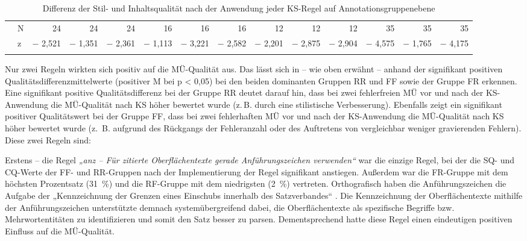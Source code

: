 \begin{sidewaystable}
\begin{tabularx}{\textwidth}{llrrrrrrrrrrrr}
& N & \cellcolor{lsLightGreen}24 & 24 & \cellcolor{lsLightGreen}24 & 16 & \cellcolor{lsLightGreen}16 & \cellcolor{lsLightGreen}16 & \cellcolor{lsLightGreen}12 & \cellcolor{lsLightGreen}12 & \cellcolor{lsLightGreen}12 & \cellcolor{lsLightGreen}35 & 35 & \cellcolor{lsLightGreen}35\\
& z & \cellcolor{lsLightGreen}$-$ 2,521 &  $-$ 1,351 & \cellcolor{lsLightGreen}$-$ 2,361 & $-$ 1,113 & \cellcolor{lsLightGreen}$-$ 3,221 & \cellcolor{lsLightGreen}$-$ 2,582 & \cellcolor{lsLightGreen}$-$ 2,201 & \cellcolor{lsLightGreen}$-$ 2,875 & \cellcolor{lsLightGreen}$-$ 2,904 & \cellcolor{lsLightGreen}$-$ 4,575 & $-$ 1,765 & \cellcolor{lsLightGreen}$-$ 4,175\\
\lspbottomrule
\end{tabularx}
\caption{\label{tab:06:101}Differenz der Stil- und Inhaltsqualität nach der Anwendung jeder KS-Regel auf Annotationsgruppenebene}
\end{sidewaystable}

Nur zwei Regeln wirkten sich positiv auf die MÜ-Qualität aus. Das lässt sich in  -- wie oben erwähnt -- anhand der signifikant positiven Qualitätsdifferenzmittelwerte (positiver M bei p < 0,05) bei den beiden dominanten Gruppen RR und FF sowie der Gruppe FR erkennen. Eine signifikant positive Qualitätsdifferenz bei der Gruppe RR deutet darauf hin, dass bei zwei fehlerfreien MÜ vor und nach der KS-Anwendung die MÜ-Qualität nach KS höher bewertet wurde (z.\,B. durch eine stilistische Verbesserung). Ebenfalls zeigt ein signifikant positiver Qualitätswert bei der Gruppe FF, dass bei zwei fehlerhaften MÜ vor und nach der KS-Anwendung die MÜ-Qualität nach KS höher bewertet wurde (z.~B. aufgrund des Rückgangs der Fehleranzahl oder des Auftretens von vergleichbar weniger gravierenden Fehlern). Diese zwei Regeln sind:

Erstens -- die Regel \textit{„anz -- Für zitierte Oberflächentexte gerade Anführungszeichen verwenden“} war die einzige Regel, bei der die SQ- und CQ-Werte der FF- und RR-Gruppen nach der Implementierung der Regel signifikant anstiegen. Außerdem war die FR-Gruppe mit dem höchsten Prozentsatz (31~\%) und die RF-Gruppe mit dem niedrigsten (2~\%) vertreten. Orthografisch haben die Anführungszeichen die Aufgabe der „Kennzeichnung der Grenzen eines Einschubs innerhalb des Satzverbandes“ \citep[253]{Nerius2007}. Die Kennzeichnung der Oberflächentexte mithilfe der Anführungszeichen unterstützte demnach systemübergreifend dabei, die Oberflächentexte als spezifische Begriffe bzw. Mehrwortentitäten zu identifizieren und somit den Satz besser zu parsen. Dementsprechend hatte diese Regel einen eindeutigen positiven Einfluss auf die MÜ-Qualität.

